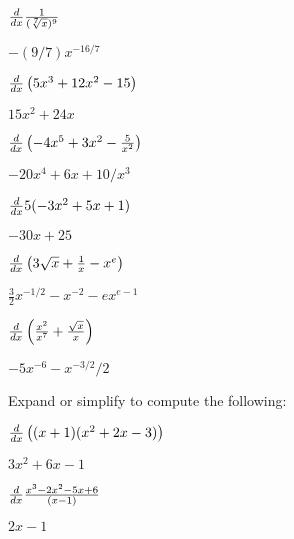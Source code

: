 \begin{exercises}
\begin{exercise} $\frac{d}{dx} \frac{1}{(\sqrt[7]{x})^9}$
\begin{answer} $-(9/7)x^{-16/7}$
\end{answer}\end{exercise}


\begin{exercise} $\frac{d}{dx} \left(5x^3+12x^2-15\right)$
\begin{answer} $15x^2+24x$
\end{answer}\end{exercise}

\begin{exercise} $\frac{d}{dx} \left(-4x^5 + 3x^2 - \frac{5}{x^2}\right)$
\begin{answer} $-20x^4+6x+10/x^3$
\end{answer}\end{exercise}

\begin{exercise} $\frac{d}{dx} 5(-3x^2 + 5x + 1)$
\begin{answer} $-30x+25$
\end{answer}\end{exercise}

\begin{exercise} $\frac{d}{dx} \left(3\sqrt{x} + \frac{1}{x} - x^e\right)$
\begin{answer} $\frac{3}{2}x^{-1/2}-x^{-2}-ex^{e-1}$
\end{answer}\end{exercise}


\begin{exercise} $\frac{d}{dx} \left(\frac{x^2}{x^7}+\frac{\sqrt{x}}{x}\right)$
\begin{answer} $-5x^{-6} - x^{-3/2}/2$
\end{answer}\end{exercise}
\endtwocol

\noindent Expand or simplify to compute the following:

\twocol

\begin{exercise} $\frac{d}{dx} \left((x+1)(x^2+2x-3)\right)$
\begin{answer} $3x^2+6x-1$
\end{answer}\end{exercise}

\begin{exercise} $\frac{d}{dx} \frac{x^3 -2x^2 -5x + 6}{(x-1)}$
\begin{answer} $2x-1 $
\end{answer}\end{exercise}


\end{exercises}
